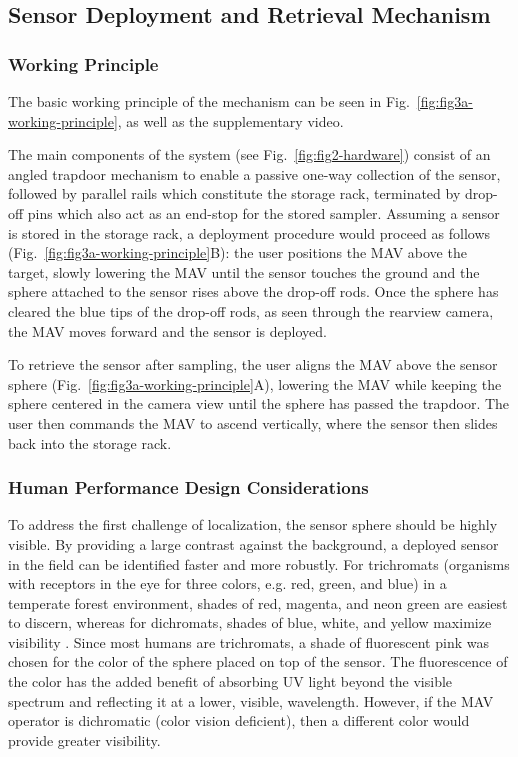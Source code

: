 \subsection{Sensor Deployment and Retrieval Mechanism}

\subsubsection{Working Principle}

The basic working principle of the mechanism can be seen in Fig.~\ref{fig:fig3a-working-principle}, as well as the supplementary video.

The main components of the system (see Fig.~\ref{fig:fig2-hardware}) consist of an angled trapdoor mechanism to enable a passive one-way collection of the sensor, followed by parallel rails which constitute the storage rack, terminated by drop-off pins which also act as an end-stop for the stored sampler. Assuming a sensor is stored in the storage rack, a deployment procedure would proceed as follows (Fig.~\ref{fig:fig3a-working-principle}B): the user positions the \ac{MAV} above the target, slowly lowering the \ac{MAV} until the sensor touches the ground and the sphere attached to the sensor rises above the drop-off rods. Once the sphere has cleared the blue tips of the drop-off rods, as seen through the rearview camera, the \ac{MAV} moves forward and the sensor is deployed.

To retrieve the sensor after sampling, the user aligns the \ac{MAV} above the sensor sphere (Fig.~\ref{fig:fig3a-working-principle}A), lowering the \ac{MAV} while keeping the sphere centered in the camera view until the sphere has passed the trapdoor. The user then commands the \ac{MAV} to ascend vertically, where the sensor then slides back into the storage rack.

\subsubsection{Human Performance Design Considerations}

To address the first challenge of localization, the sensor sphere should be highly visible. By providing a large contrast against the background, a deployed sensor in the field can be identified faster and more robustly.
For trichromats (organisms with receptors in the eye for three colors, e.g. red, green, and blue) in a temperate forest environment, shades of red, magenta, and neon green are easiest to discern, whereas for dichromats, shades of blue, white, and yellow maximize visibility \cite{Fennell2019}. Since most humans are trichromats, a shade of fluorescent pink was chosen for the color of the sphere placed on top of the sensor. The fluorescence of the color has the added benefit of absorbing UV light beyond the visible spectrum and reflecting it at a lower, visible, wavelength. However, if the \ac{MAV} operator is dichromatic (color vision deficient), then a different color would provide greater visibility. 

